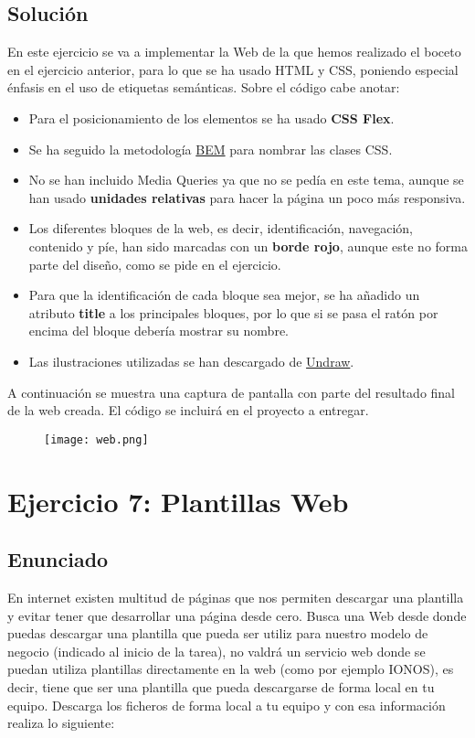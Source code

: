 \subsection{Solución}
En este ejercicio se va a implementar la Web de la que hemos realizado el boceto en el ejercicio anterior, para lo que se ha usado HTML y CSS, poniendo especial énfasis en el uso de etiquetas semánticas. Sobre el código cabe anotar:

\begin{itemize}
    \item Para el posicionamiento de los elementos se ha usado \textbf{CSS Flex}.
    \item Se ha seguido la metodología \href{https://getbem.com/introduction/}{BEM} para nombrar las clases CSS.
    \item No se han incluido Media Queries ya que no se pedía en este tema, aunque se han usado \textbf{unidades relativas} para hacer la página un poco más responsiva.
    \item Los diferentes bloques de la web, es decir, identificación, navegación, contenido y píe, han sido marcadas con un \textbf{borde rojo}, aunque este no forma parte del diseño, como se pide en el ejercicio.
    \item Para que la identificación de cada bloque sea mejor, se ha añadido un atributo \textbf{title} a los principales bloques, por lo que si se pasa el ratón por encima del bloque debería mostrar su nombre.
    \item Las ilustraciones utilizadas se han descargado de \href{https://undraw.co/illustrations}{Undraw}.
\end{itemize}

A continuación se muestra una captura de pantalla con parte del resultado final de la web creada. El código se incluirá en el proyecto a entregar.

\begin{figure}[H]
    \centering
    \texttt{[image: web.png]}
\end{figure}

\section{Ejercicio 7: Plantillas Web}
\subsection{Enunciado}
En internet existen multitud de páginas que nos permiten descargar una plantilla y evitar tener que desarrollar una página desde cero. Busca una Web desde donde puedas descargar una plantilla que pueda ser utiliz para nuestro modelo de negocio (indicado al inicio de la tarea), no valdrá un servicio web donde se puedan utiliza plantillas directamente en la web (como por ejemplo IONOS), es decir, tiene que ser una plantilla que pueda descargarse de forma local en tu equipo. Descarga los ficheros de forma local a tu equipo y con esa información realiza lo siguiente:


